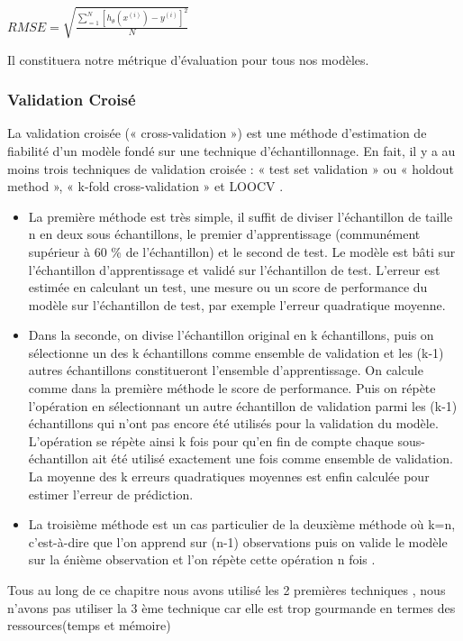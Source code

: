  $RMSE=\sqrt{\frac{\sum _{=1}^{N}{\left[{h}_{\theta}\left({x}^{(i)}\right) - {y}^{(i)}\right]}^2} {N}}$
 
 Il constituera notre métrique d'évaluation pour tous nos modèles.
\subsubsection{Validation Croisé  \cite{CrossValidation}}
La validation croisée (« cross-validation ») est une méthode d’estimation de fiabilité d’un modèle fondé sur une technique d’échantillonnage. En fait, il y a au moins trois techniques de validation croisée : « test set validation » ou « holdout method », « k-fold cross-validation » et \ac{LOOCV} .
\begin{itemize}
	\item La première méthode est très simple, il suffit de diviser l'échantillon de taille n en deux sous échantillons, le premier d'apprentissage (communément supérieur à 60 \% de l'échantillon) et le second de test. Le modèle est bâti sur l'échantillon d'apprentissage et validé sur l'échantillon de test. L'erreur est estimée en calculant un test, une mesure ou un score de performance du modèle sur l'échantillon de test, par exemple l'erreur quadratique moyenne.
	\item Dans la seconde, on divise l'échantillon original en k échantillons, puis on sélectionne un des k échantillons comme ensemble de validation et les (k-1) autres échantillons constitueront l'ensemble d'apprentissage. On calcule comme dans la première méthode le score de performance. Puis on répète l'opération en sélectionnant un autre échantillon de validation parmi les (k-1) échantillons qui n'ont pas encore été utilisés pour la validation du modèle. L'opération se répète ainsi k fois pour qu'en fin de compte chaque sous-échantillon ait été utilisé exactement une fois comme ensemble de validation. La moyenne des k erreurs quadratiques moyennes est enfin calculée pour estimer l'erreur de prédiction. 
	\item La troisième méthode est un cas particulier de la deuxième méthode où k=n, c'est-à-dire que l'on apprend sur (n-1) observations puis on valide le modèle sur la énième observation et l'on répète cette opération n fois . 
\end{itemize}

Tous au long de ce chapitre nous avons utilisé les 2 premières techniques , nous n'avons pas utiliser la 3 ème technique car elle est trop gourmande  en termes des ressources(temps et mémoire) 

